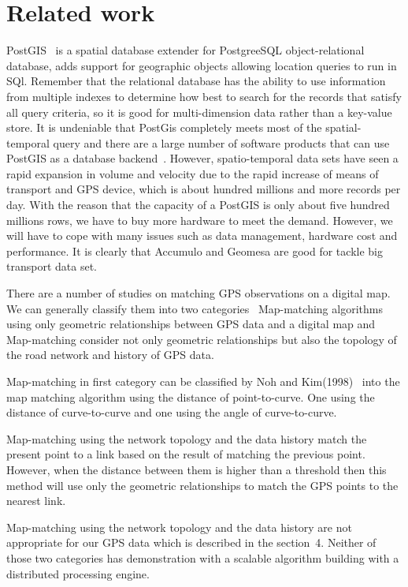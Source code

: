 \documentclass{acm_proc_article-sp}
\begin{document}
\section{Related work}

PostGIS~\cite{posgis} is a spatial database extender for PostgreeSQL object-relational database, adds support for geographic objects allowing location queries to run in SQl. Remember that the relational database has the ability to use information from multiple indexes to determine how best to search for the records that satisfy all query criteria, so it is good for multi-dimension data rather than a key-value store. It is undeniable that PostGis completely meets most of the spatial-temporal query and there are a large number of software products that can use PostGIS as a database backend~\cite{backendposgis}. However, spatio-temporal data sets have seen a rapid expansion in volume and velocity due to the rapid increase of means of transport and GPS device, which is about hundred millions and more records per day. With the reason that the capacity of a PostGIS is only about five hundred millions rows, we have to buy more hardware to meet the demand. However, we will have to cope with many issues such as data management, hardware cost and performance. It is clearly that Accumulo and Geomesa are good for tackle big transport data set.

There are a number of studies on matching GPS observations on a digital map. We can generally classify them into two categories~\cite{yang2005map} Map-matching algorithms using only geometric relationships between GPS data and a digital map and Map-matching consider not only geometric relationships but also the topology of the road network and history of GPS data.
		
		\setlength{\parindent}{0.7cm} Map-matching in first category can be classified by Noh and Kim(1998)~\cite{noh1998map} into the map matching algorithm using the distance of point-to-curve. One using the distance of curve-to-curve and one using the angle of curve-to-curve.
		
		\setlength{\parindent}{0.7cm} Map-matching using the network topology and the data history match the present point to a link based on the result of matching the previous point. However, when the distance between them is higher than a threshold then this method will use only the geometric relationships to match the GPS points to the nearest link.
		
		\setlength{\parindent}{0.7cm} Map-matching using the network topology and the data history are not appropriate for our GPS data which is described in the section~4. Neither of those two categories has demonstration with a scalable algorithm building with a distributed processing engine. 
			
\end{document}
